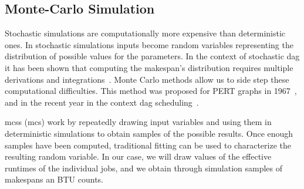 \documentclass[10pt,conference,compsocconf]{IEEEtran}
\begin{document}
\subsection{Monte-Carlo Simulation}\label{sec:MCS}

Stochastic  simulations are  computationally more  expensive than  deterministic
ones. In stochastic simulations inputs  become random variables representing the
distribution of possible values for the parameters. In the context of stochastic
\ac{dag} it has  been shown that computing the  makespan's distribution requires
multiple derivations and  integrations~\cite{Ludwig01,Li97}. Monte Carlo methods
allow us to side step these computational difficulties. This method was proposed
for PERT  graphs in 1967~\cite{Slyke63}, and  in the recent year  in the context
\ac{dag} scheduling~\cite{Canon10,Zheng13}.

\aclp{mcs} (\acs{mcs})  work by  repeatedly drawing  input variables
and using  them in deterministic simulations  to obtain samples of  the possible
results. Once enough samples have been computed, traditional fitting can be used
to characterize the resulting random variable.  In our case, we will draw values
of  the  effective runtimes  of  the  individual  jobs,  and we  obtain  through
simulation samples of makespans an BTU counts.
\end{document}
